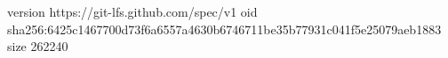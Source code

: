 version https://git-lfs.github.com/spec/v1
oid sha256:6425c1467700d73f6a6557a4630b6746711be35b77931c041f5e25079aeb1883
size 262240
